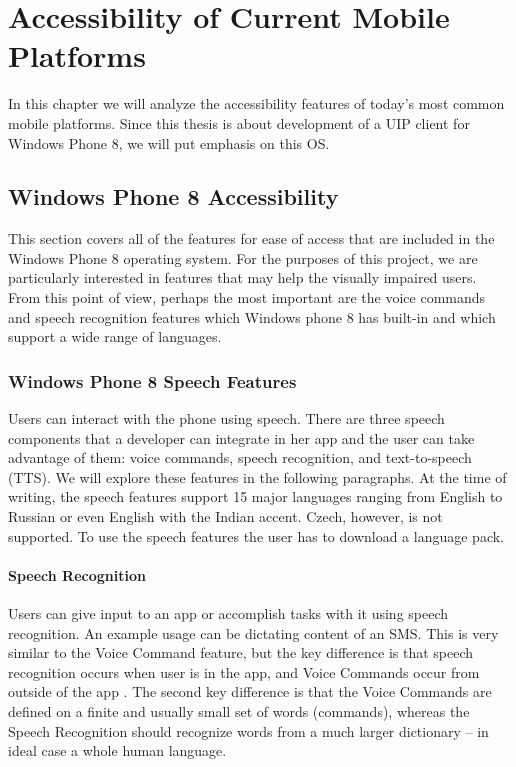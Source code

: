 \chapter{Accessibility of Current Mobile Platforms}
In this chapter we will analyze the accessibility features of today's most common mobile platforms. Since this thesis is about development of a UIP client for Windows Phone 8, we will put emphasis on this OS.
\section{Windows Phone 8 Accessibility}
This section covers all of the features for ease of access that are included in the Windows Phone 8 operating system. For the purposes of this project, we are particularly interested in features that may help the visually impaired users. From this point of view, perhaps the most important are the voice commands and speech recognition features which Windows phone 8 has built-in and which support a wide range of languages.

\subsection{Windows Phone 8 Speech Features}
Users can interact with the phone using speech. There are three speech components that a developer can integrate in her app and the user can take advantage of them: voice commands, speech recognition, and text-to-speech (TTS). We will explore these features in the following paragraphs.
At the time of writing, the speech features support 15 major languages ranging from English to Russian or even English with the Indian accent. Czech, however, is not supported. To use the speech features the user has to download a language pack.

\subsubsection{Speech Recognition}
Users can give input to an app or accomplish tasks with it using speech recognition. An example usage can be dictating content of an SMS. This is very similar to the Voice Command feature, but the key difference is that speech recognition occurs when user is in the app, and Voice Commands occur from outside of the app \cite{phone8speech}. The second key difference is that the Voice Commands are defined on a finite and usually small set of words (commands), whereas the Speech Recognition should recognize words from a much larger dictionary – in ideal case a whole human language.

